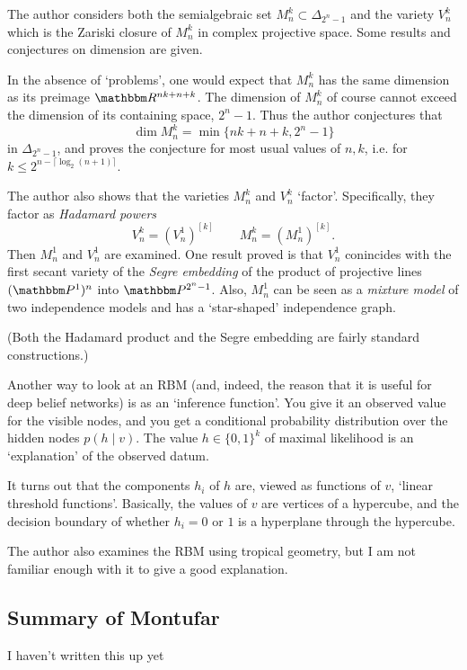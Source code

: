 \documentclass[12pt]{article}
\begin{document}
The author considers both the semialgebraic set $M_n^k \subset \Delta_{2^n - 1}$
and the variety $V_n^k$ which is the Zariski closure of $M_n^k$ in complex
projective space.  Some results and conjectures on dimension are given.

In the absence of `problems', one would expect that $M_n^k$ has the same
dimension as its preimage $\R^{nk + n + k}$.  The dimension of $M_n^k$ of course
cannot exceed the dimension of its containing space, $2^n - 1$.  Thus the author
conjectures that
\[
    \dim M_n^k = \min\{nk+n+k, 2^n -1\}
\]
in $\Delta_{2^n-1}$, and proves the conjecture for most usual values of $n,k$,
i.e. for $k \le 2^{n - \lceil \log_2(n+1) \rceil}$.

The author also shows that the varieties $M_n^k$ and $V_n^k$ `factor'.
Specifically, they factor as \emph{Hadamard powers}
\[
    V_n^k = (V_n^1)^{[k]}
    \qquad
    M_n^k = (M_n^1)^{[k]}.
\]
Then $M_n^1$ and $V_n^1$ are examined.  One result proved is that $V_n^1$
conincides with the first secant variety of the \emph{Segre embedding} of the
product of projective lines $(\Proj^1)^n$ into $\Proj^{2^n-1}$.  Also, $M_n^1$
can be seen as a \emph{mixture model} of two independence models and has a
`star-shaped' independence graph.

(Both the Hadamard product and the Segre embedding are fairly standard
constructions.)

Another way to look at an RBM (and, indeed, the reason that it is useful for
deep belief networks) is as an `inference function'.  You give it an observed
value for the visible nodes, and you get a conditional probability distribution
over the hidden nodes $p(h \mid v)$.  The value $h \in \{0,1\}^k$ of maximal
likelihood is an `explanation' of the observed datum.

It turns out that the components $h_i$ of $h$ are, viewed as functions of $v$,
`linear threshold functions'.  Basically, the values of $v$ are vertices of a
hypercube, and the decision boundary of whether $h_i = 0$ or $1$ is a hyperplane
through the hypercube.

The author also examines the RBM using tropical geometry, but I am not familiar
enough with it to give a good explanation.

\subsection{Summary of Montufar}

I haven't written this up yet
\end{document}
